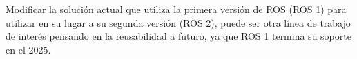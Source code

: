 Modificar la solución actual que utiliza la primera versión de \gls{ROS} (\gls{ROS} 1)
para utilizar en su lugar a su segunda versión (\gls{ROS} 2), puede ser otra línea de
trabajo de interés pensando en la reusabilidad a futuro, ya que \gls{ROS} 1 termina
su soporte en el 2025.















